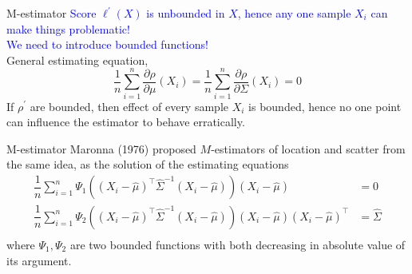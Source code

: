 \documentclass[10pt,xcolor=svgnames]{beamer} %
\newcommand{\tr}{^{\intercal}}
\begin{document}
\begin{frame}{M-estimator}
    \textcolor{blue}{Score $\ell^{\prime}(X)$ is unbounded in $X$, hence any one sample $X_i$ can make things problematic!}\\
    \textcolor{blue}{We need to introduce bounded functions!}\\
    \pause
    General estimating equation,
    \begin{equation*}
        \dfrac{1}{n}\sum_{i=1}^n \dfrac{\partial \rho}{\partial \mu}(X_i) = \dfrac{1}{n}\sum_{i=1}^n \dfrac{\partial \rho}{\partial \Sigma}(X_i) = 0
    \end{equation*}
    If $\rho^{\prime}$ are bounded, then effect of every sample $X_i$ is bounded, hence no one point can influence the estimator to behave erratically.
\end{frame}

\begin{frame}{M-estimator}
    Maronna (1976) proposed $M$-estimators of location and scatter from the same idea, as the solution of the estimating equations
    \begin{align*}
        \dfrac{1}{n}\sum_{i=1}^n \Psi_1\left( (X_i - \widehat{\mu})\tr\widehat{\Sigma}^{-1}(X_i - \widehat{\mu}) \right)(X_i - \widehat{\mu}) & = 0\\
        \dfrac{1}{n}\sum_{i=1}^n \Psi_2\left( (X_i - \widehat{\mu})\tr\widehat{\Sigma}^{-1}(X_i - \widehat{\mu}) \right)(X_i - \widehat{\mu})(X_i - \widehat{\mu})\tr & = \widehat{\Sigma}\\
    \end{align*}
    \noindent where $\Psi_1, \Psi_2$ are two bounded functions with both decreasing in absolute value of its argument.
\end{frame}
\end{document}
